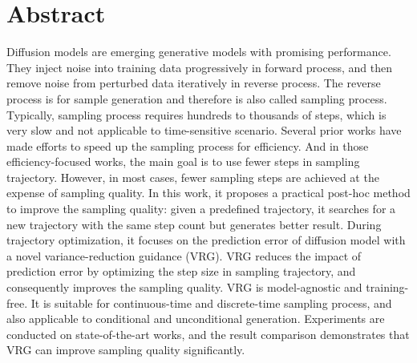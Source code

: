 \chapter* {Abstract}

Diffusion models are emerging generative models with promising performance. They inject noise into training data progressively in forward process, and then remove noise from perturbed data iteratively in reverse process. The reverse process is for sample generation and therefore is also called sampling process.
Typically, sampling process requires hundreds to thousands of steps, which is very slow and not applicable to time-sensitive scenario. Several prior works have made efforts to speed up the sampling process for efficiency. And in those efficiency-focused works, the main goal is to use fewer steps in sampling trajectory.
However, in most cases, fewer sampling steps are achieved at the expense of sampling quality. In this work, it proposes a practical post-hoc method to improve the sampling quality: given a predefined trajectory, it searches for a new trajectory with the same step count but generates better result.
During trajectory optimization, it focuses on the prediction error of diffusion model with a novel variance-reduction guidance (VRG). VRG reduces the impact of prediction error by optimizing the step size in sampling trajectory, and consequently improves the sampling quality.
VRG is model-agnostic and training-free. It is suitable for continuous-time and discrete-time sampling process, and also applicable to conditional and unconditional generation. Experiments are conducted on state-of-the-art works, and the result comparison demonstrates that VRG can improve sampling quality significantly.
